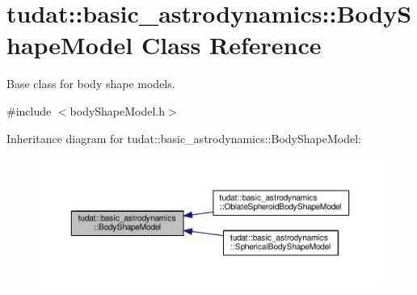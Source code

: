 \hypertarget{classtudat_1_1basic__astrodynamics_1_1BodyShapeModel}{}\section{tudat\+:\+:basic\+\_\+astrodynamics\+:\+:Body\+Shape\+Model Class Reference}
\label{classtudat_1_1basic__astrodynamics_1_1BodyShapeModel}


Base class for body shape models.  




{\ttfamily \#include $<$body\+Shape\+Model.\+h$>$}



Inheritance diagram for tudat\+:\+:basic\+\_\+astrodynamics\+:\+:Body\+Shape\+Model\+:
\nopagebreak
\begin{figure}[H]
\begin{center}
\leavevmode
\includegraphics[width=350pt]{classtudat_1_1basic__astrodynamics_1_1BodyShapeModel__inherit__graph}
\end{center}
\end{figure}
